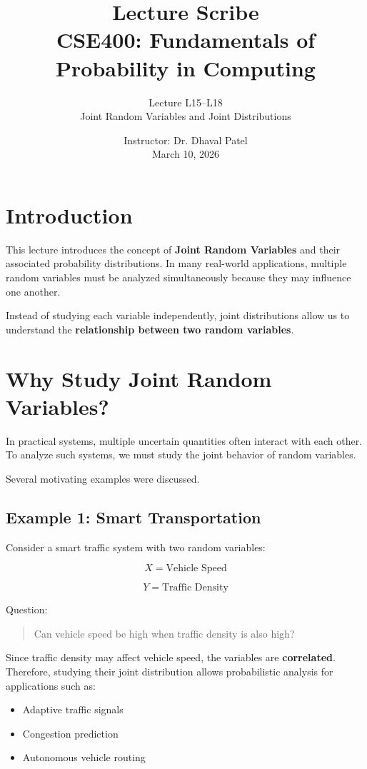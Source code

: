 \documentclass[12pt]{article}
\title{Lecture Scribe \\ \large CSE400: Fundamentals of Probability in Computing}
\author{Lecture L15--L18 \\ Joint Random Variables and Joint Distributions}
\date{Instructor: Dr. Dhaval Patel \\ March 10, 2026}
\begin{document}
\maketitle

\onehalfspacing

\section{Introduction}

This lecture introduces the concept of \textbf{Joint Random Variables} and their associated probability distributions. 
In many real-world applications, multiple random variables must be analyzed simultaneously because they may influence one another.

Instead of studying each variable independently, joint distributions allow us to understand the \textbf{relationship between two random variables}.

\section{Why Study Joint Random Variables?}

In practical systems, multiple uncertain quantities often interact with each other. 
To analyze such systems, we must study the joint behavior of random variables.

Several motivating examples were discussed.

\subsection{Example 1: Smart Transportation}

Consider a smart traffic system with two random variables:

\[
X = \text{Vehicle Speed}
\]

\[
Y = \text{Traffic Density}
\]

Question:

\begin{quote}
Can vehicle speed be high when traffic density is also high?
\end{quote}

Since traffic density may affect vehicle speed, the variables are \textbf{correlated}. 
Therefore, studying their joint distribution allows probabilistic analysis for applications such as:

\begin{itemize}
\item Adaptive traffic signals
\item Congestion prediction
\item Autonomous vehicle routing
\end{itemize}
\end{document}
